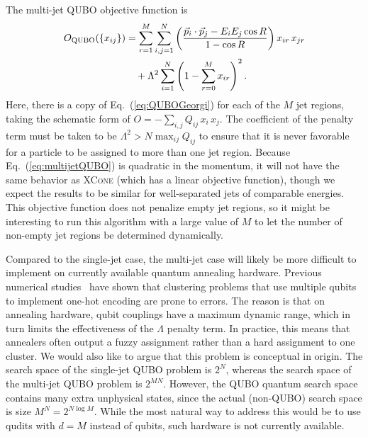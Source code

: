 \documentclass[aps,prd,twocolumn,superscriptaddress,preprintnumbers,nofootinbib,longbibliography,floatfix]{revtex4-1}
\DeclareRobustCommand{\Eq}[1]{Eq.~(\ref{#1})}
\begin{document}
The multi-jet QUBO objective function is
%
\begin{align}
O_{\rm QUBO}(\{x_{ij}\}) &= \sum_{r = 1}^M  \sum_{i,j = 1}^N \left(\frac{\vec{p}_i\cdot\vec{p}_j - E_iE_j\cos R}{1 - \cos R} \right) x_{ir} \, x_{jr} \nonumber \\
&\quad + \Lambda^2 \sum_{i=1}^N\left(1-\sum_{r=0}^{M} x_{ir}\right)^2. \label{eq:multijetQUBO}
\end{align}
%
Here, there is a copy of \Eq{eq:QUBOGeorgi} for each of the $M$ jet regions, taking the schematic form of $O=-\sum_{i,j} Q_{ij} \, x_i \, x_j$.
%
The coefficient of the penalty term must be taken to be $\Lambda^2 > N \max_{ij} {Q_{ij}}$ to ensure that it is never favorable for a particle to be assigned to more than one jet region.
%
Because \Eq{eq:multijetQUBO} is quadratic in the momentum, it will not have the same behavior as \textsc{XCone} (which has a linear objective function), though we expect the results to be similar for well-separated jets of comparable energies.
%
This objective function does not penalize empty jet regions, so it might be interesting to run this algorithm with a large value of $M$ to let the number of non-empty jet regions be determined dynamically.



Compared to the single-jet case, the multi-jet case will likely be more difficult to implement on currently available quantum annealing hardware.
%
Previous numerical studies~\cite{2018QuIP...17...39K} have shown that clustering problems that use multiple qubits to implement one-hot encoding are prone to errors.
%
The reason is that on annealing hardware, qubit couplings have a maximum dynamic range, which in turn limits the effectiveness of the $\Lambda$ penalty term.
%
In practice, this means that annealers often output a fuzzy assignment rather than a hard assignment to one cluster.
%
We would also like to argue that this problem is conceptual in origin.
%
The search space of the single-jet QUBO problem is $2^N$, whereas the search space of the multi-jet \ac{QUBO} problem is $2^{MN}$.
%
However, the \ac{QUBO} quantum search space contains many extra unphysical states, since the actual (non-QUBO) search space is size $M^N=2^{N\log M}$.
%
While the most natural way to address this would be to use qudits with $d=M$ instead of qubits, such hardware is not currently available.
\end{document}
